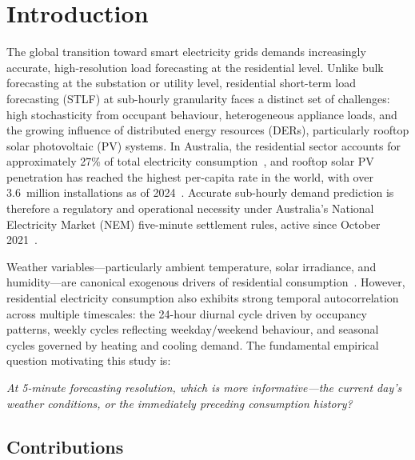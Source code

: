 \documentclass[12pt,a4paper]{article}
\begin{document}
\tableofcontents
\clearpage

\section{Introduction}
\label{sec:intro}

The global transition toward smart electricity grids demands increasingly
accurate, high-resolution load forecasting at the residential level. Unlike
bulk forecasting at the substation or utility level, residential short-term
load forecasting (STLF) at sub-hourly granularity faces a distinct set of
challenges: high stochasticity from occupant behaviour, heterogeneous appliance
loads, and the growing influence of distributed energy resources (DERs),
particularly rooftop solar photovoltaic (PV) systems. In Australia, the
residential sector accounts for approximately 27\% of total electricity
consumption~\cite{aer2023}, and rooftop solar PV penetration has reached the
highest per-capita rate in the world, with over 3.6~million installations as
of 2024~\cite{cer2024}. Accurate sub-hourly demand prediction is therefore a
regulatory and operational necessity under Australia's National Electricity
Market (NEM) five-minute settlement rules, active since October
2021~\cite{aemo2021}.

Weather variables---particularly ambient temperature, solar irradiance, and
humidity---are canonical exogenous drivers of residential consumption~\cite{hong2016,lahouar2015}. However, residential electricity consumption
also exhibits strong temporal autocorrelation across multiple timescales: the
24-hour diurnal cycle driven by occupancy patterns, weekly cycles reflecting
weekday/weekend behaviour, and seasonal cycles governed by heating and cooling
demand. The fundamental empirical question motivating this study is:

\begin{center}
\textit{At 5-minute forecasting resolution, which is more informative---the
current day's weather conditions, or the immediately preceding consumption
history?}
\end{center}

\subsection{Contributions}
\label{subsec:contributions}
\end{document}
